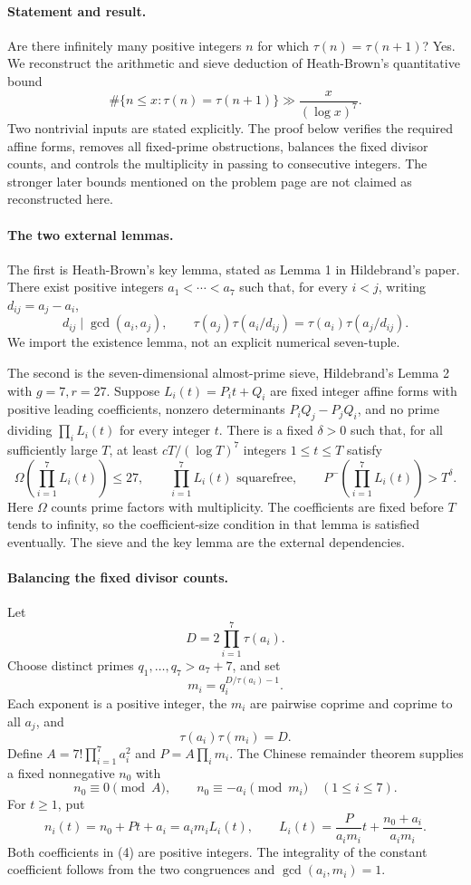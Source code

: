 \paragraph{Statement and result.}
Are there infinitely many positive integers \(n\) for which \(\tau(n)=\tau(n+1)\)? Yes. We reconstruct the arithmetic and sieve deduction of Heath-Brown's quantitative bound
\[
 \#\{n\leq x:\tau(n)=\tau(n+1)\}\gg\frac{x}{(\log x)^7}.
\]
Two nontrivial inputs are stated explicitly. The proof below verifies the required affine forms, removes all fixed-prime obstructions, balances the fixed divisor counts, and controls the multiplicity in passing to consecutive integers. The stronger later bounds mentioned on the problem page are not claimed as reconstructed here.

\paragraph{The two external lemmas.}
The first is Heath-Brown's key lemma, stated as Lemma 1 in Hildebrand's paper. There exist positive integers \(a_1<\cdots<a_7\) such that, for every \(i<j\), writing \(d_{ij}=a_j-a_i\),
\[
 d_{ij}\mid\gcd(a_i,a_j),\qquad
 \tau(a_j)\tau(a_i/d_{ij})
 =\tau(a_i)\tau(a_j/d_{ij}). \tag{1}
\]
We import the existence lemma, not an explicit numerical seven-tuple.

The second is the seven-dimensional almost-prime sieve, Hildebrand's Lemma 2 with \(g=7,r=27\). Suppose \(L_i(t)=P_i t+Q_i\) are fixed integer affine forms with positive leading coefficients, nonzero determinants \(P_iQ_j-P_jQ_i\), and no prime dividing \(\prod_iL_i(t)\) for every integer \(t\). There is a fixed \(\delta>0\) such that, for all sufficiently large \(T\), at least \(cT/(\log T)^7\) integers \(1\leq t\leq T\) satisfy
\[
 \Omega\left(\prod_{i=1}^7L_i(t)\right)\leq27,
 \qquad \prod_{i=1}^7L_i(t)\text{ squarefree},
 \qquad P^-\left(\prod_{i=1}^7L_i(t)\right)>T^\delta. \tag{2}
\]
Here \(\Omega\) counts prime factors with multiplicity. The coefficients are fixed before \(T\) tends to infinity, so the coefficient-size condition in that lemma is satisfied eventually. The sieve and the key lemma are the external dependencies.

\paragraph{Balancing the fixed divisor counts.}
Let
\[
 D=2\prod_{i=1}^7\tau(a_i).
\]
Choose distinct primes \(q_1,\ldots,q_7>a_7+7\), and set
\[
 m_i=q_i^{D/\tau(a_i)-1}.
\]
Each exponent is a positive integer, the \(m_i\) are pairwise coprime and coprime to all \(a_j\), and
\[
 \tau(a_i)\tau(m_i)=D. \tag{3}
\]
Define \(A=7!\prod_{i=1}^7a_i^2\) and \(P=A\prod_i m_i\). The Chinese remainder theorem supplies a fixed nonnegative \(n_0\) with
\[
 n_0\equiv0\pmod A,\qquad n_0\equiv-a_i\pmod{m_i}\quad(1\leq i\leq7).
\]
For \(t\geq1\), put
\[
 n_i(t)=n_0+Pt+a_i=a_i m_i L_i(t),\qquad
 L_i(t)=\frac{P}{a_i m_i}t+\frac{n_0+a_i}{a_i m_i}. \tag{4}
\]
Both coefficients in (4) are positive integers. The integrality of the constant coefficient follows from the two congruences and \(\gcd(a_i,m_i)=1\).

